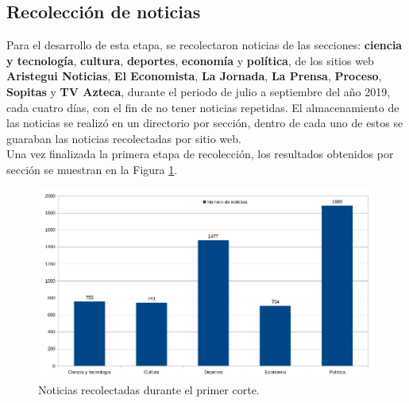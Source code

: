 \begin{table}[H]
\centering
{}
\caption{Ejemplo de estructura de un archivo CSV}
\label{tab:csv}
\end{table}

\subsection{Recolección de noticias}

Para el desarrollo de esta etapa, se recolectaron noticias de las secciones: \textbf{ciencia y tecnología}, \textbf{cultura}, \textbf{deportes}, \textbf{economía} y \textbf{política}, de los sitios web \textbf{Aristegui Noticias}, \textbf{El Economista}, \textbf{La Jornada}, \textbf{La Prensa}, \textbf{Proceso}, \textbf{Sopitas} y \textbf{TV Azteca}, durante el periodo de julio a septiembre del año 2019, cada cuatro días, con el fin de no tener noticias repetidas. El almacenamiento de las noticias se realizó en un directorio por sección, dentro de cada uno de estos se guaraban las noticias recolectadas por sitio web.\\

Una vez finalizada la primera etapa de recolección, los resultados obtenidos por sección se muestran en la Figura  \ref{Fig:notseccionV1}.
\begin{figure}[H]
	\centering
	\includegraphics[scale=.35]{imagenes/Capitulo5/noticiasPorSeccionV1.png}
	\caption{Noticias recolectadas durante el primer corte.}
	\label{Fig:notseccionV1}
\end{figure}

